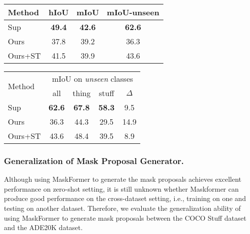 \documentclass[runningheads]{llncs}
\makeatletter
\newcommand\tabcaption{\def\@captype{table}\caption}
\makeatother
\begin{document}
\begin{figtab}
\footnotesize
  \begin{minipage}[t]{0.48\linewidth}
    \centering
    \tabcaption{Comparison with supervised method on COCO Stuff validation dataset. Sup: MaskFormer trained on both \emph{seen} classes and \emph{unseen} classes.}
    \vspace{1.0em}
    \begin{tabular}{l|c|c|c}
    \toprule
    Method& hIoU&mIoU & mIoU-unseen\\
      \hline        
      Sup&\textbf{49.4}&\textbf{42.6}&\textbf{62.6}\\
      Ours&37.8&39.2&36.3\\
      Ours+ST&41.5&39.9&43.6\\
    \bottomrule
    \end{tabular}
    \label{tab:coco_stuff_sup}
  \end{minipage}\quad
  \begin{minipage}[t]{0.48\linewidth}
    \centering
    \tabcaption{Comparison  with supervised method on the \emph{unseen} classes of COCO Stuff validation set. $\Delta$ is the difference in mIoU between things and stuff of \emph{unseen} classes.}
    \vspace{0.5em}
    \begin{tabular}{l|c|c|c|c}
    \toprule
    \multirow{2}{*}{Method}&\multicolumn{4}{c}{mIoU on \emph{unseen} classes}\\
    \cline{2-5}
    & all&thing&stuff&$\Delta$\\
      \hline
      Sup&\textbf{62.6}&\textbf{67.8}&\textbf{58.3}&9.5\\
      Ours&36.3&44.3&29.5&14.9\\
      Ours+ST&43.6&48.4&39.5&8.9\\
    \bottomrule
    \end{tabular}
    \label{tab:coco_stuff_sup_thing_stuff}
  \end{minipage}
  \vspace{-1em}
\end{figtab}

\subsubsection{Generalization of Mask Proposal Generator.} 
Although using MaskFormer to generate the mask proposals achieves excellent performance on zero-shot setting, it is still unknown whether Maskformer can produce good performance on the cross-dataset setting, i.e., training on one and testing on another dataset. Therefore, we evaluate the generalization ability of using MaskFormer to generate mask proposals between the COCO Stuff dataset and the ADE20K dataset.
\end{document}
